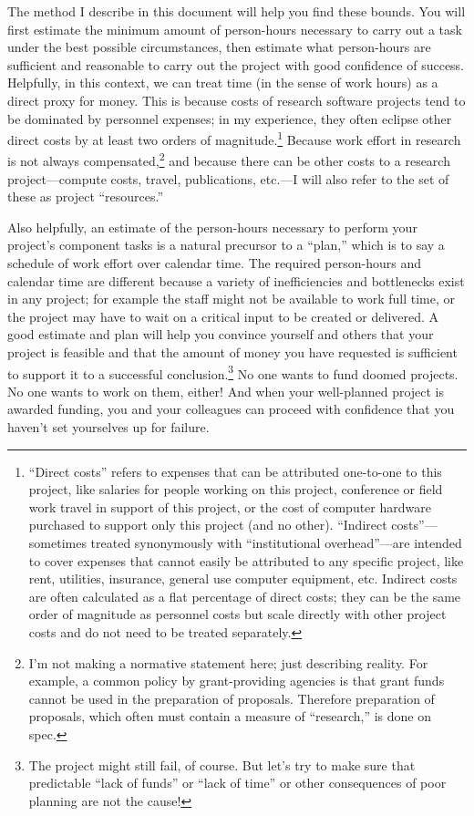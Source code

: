\documentclass[12pt,oneside]{book}
\begin{document}
The method I describe in this document will help you find these bounds. You will first estimate the minimum amount of person-hours necessary to carry out a task under the best possible circumstances, then estimate what person-hours are sufficient and reasonable to carry out the project with good confidence of success. Helpfully, in this context, we can treat time (in the sense of work hours) as a direct proxy for money. This is because costs of research software projects tend to be dominated by personnel expenses; in my experience, they often eclipse other direct costs by at least two orders of magnitude.\footnote{
``Direct costs'' refers to expenses that can be attributed one-to-one to this project, like salaries for people working on this project, conference or field work travel in support of this project, or the cost of computer hardware purchased to support only this project (and no other). ``Indirect costs''---sometimes treated synonymously with ``institutional overhead''---are intended to cover expenses that cannot easily be attributed to any specific project, like rent, utilities, insurance, general use computer equipment, etc. Indirect costs are often calculated as a flat percentage of direct costs; they can be the same order of magnitude as personnel costs but scale directly with other project costs and do not need to be treated separately.}
Because work effort in research is not always compensated,\footnote{
I'm not making a normative statement here; just describing reality. For example, a common policy by grant-providing agencies is that grant funds cannot be used in the preparation of proposals. Therefore preparation of proposals, which often must contain a measure of ``research,'' is done on spec.}
and because there can be other costs to a research project---compute costs, travel, publications, etc.---I will also refer to the set of these as project ``resources.''

Also helpfully, an estimate of the person-hours necessary to perform your project's component tasks is a natural precursor to a ``plan,'' which is to say a schedule of work effort over calendar time. The required person-hours and calendar time are different because a variety of inefficiencies and bottlenecks exist in any project; for example the staff might not be available to work full time, or the project may have to wait on a critical input to be created or delivered. A good estimate and plan will help you convince yourself and others that your project is feasible and that the amount of money you have requested is sufficient to support it to a successful conclusion.\footnote{
The project might still fail, of course. But let’s try to make sure that predictable ``lack of funds'' or ``lack of time'' or other consequences of poor planning are not the cause!}
No one wants to fund doomed projects. No one wants to work on them, either! And when your well-planned project is awarded funding, you and your colleagues can proceed with confidence that you haven't set yourselves up for failure.
\end{document}

